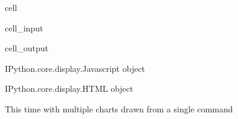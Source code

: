 \documentclass[letterpaper,10pt,english]{jupyterBook}
\begin{document}
\begin{sphinxuseclass}{cell}\begin{sphinxVerbatimInput}

\begin{sphinxuseclass}{cell_input}
\begin{sphinxVerbatim}[commandchars=\\\{\}]
\PYG{p}{[}\PYG{p}{]}
\end{sphinxVerbatim}

\end{sphinxuseclass}\end{sphinxVerbatimInput}
\begin{sphinxVerbatimOutput}

\begin{sphinxuseclass}{cell_output}
\begin{sphinxVerbatim}[commandchars=\\\{\}]
\PYGZlt{}IPython.core.display.Javascript object\PYGZgt{}
\end{sphinxVerbatim}

\begin{sphinxVerbatim}[commandchars=\\\{\}]
\PYGZlt{}IPython.core.display.HTML object\PYGZgt{}
\end{sphinxVerbatim}

\end{sphinxuseclass}\end{sphinxVerbatimOutput}

\end{sphinxuseclass}
\sphinxAtStartPar
This time with multiple charts drawn from a single command
\end{document}
